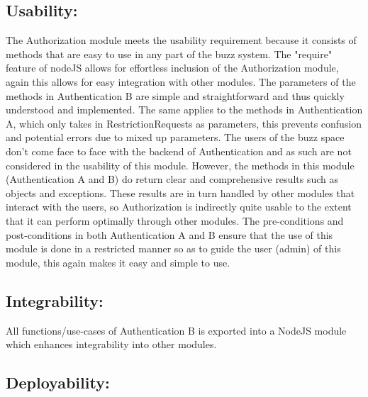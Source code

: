 \subsection{Usability:}
The Authorization module meets the usability requirement because it consists
of methods that are easy to use in any part of the buzz system.
The "require" feature of nodeJS allows for effortless inclusion of the Authorization 
module, again this allows for easy integration with other modules.
The parameters of the methods in Authentication B are simple and straightforward and thus
quickly understood and implemented. The same applies to the methods in Authentication A, 
which only takes in RestrictionRequests as parameters, this prevents confusion and potential
errors due to mixed up parameters. 
The users of the buzz space don't come face to face with the backend of Authentication and as 
such are not considered in the usability of this module. However, the methods in this module
(Authentication A and B) do return clear and comprehensive results such as objects and exceptions. 
These results are in turn handled by other modules that interact with the users, so Authorization 
is indirectly quite usable to the extent that it can perform optimally through other modules.
The pre-conditions and post-conditions in both Authentication A and B ensure that the use of this 
module is done in a restricted manner so as to guide the user (admin) of this module, this again
makes it easy and simple to use.

\subsection{Integrability:}
All functions/use-cases of Authentication B is exported into a NodeJS module which enhances integrability into other modules.

\subsection{Deployability:}